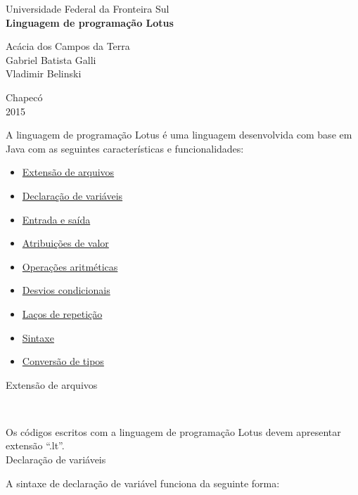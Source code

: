\documentclass[12pt,a4paper]{article}
\begin{document}
\begin{titlepage}
\begin{center}
{\large Universidade Federal da Fronteira Sul}\\[5.5cm]
{\bf \huge Linguagem de programação Lotus}\\[4.9cm]
\end{center}
{\large Acácia dos Campos da Terra}\\
{\large Gabriel Batista Galli}\\
{\large Vladimir Belinski}\\[5.8cm]
\begin{center}
{\large Chapecó}\\[0.1cm]
{\large 2015}
\end{center}
\end{titlepage}

A linguagem de programação Lotus é uma linguagem desenvolvida com base em Java com as seguintes características e funcionalidades:\\

\begin{itemize}
\item \hyperlink{label7}{Extensão de arquivos}
\item \hyperlink{label}{Declaração de variáveis}
\item \hyperlink{label1}{Entrada e saída}
\item \hyperlink{label2}{Atribuições de valor}
\item \hyperlink{label3}{Operações aritméticas}
\item \hyperlink{label4}{Desvios condicionais}
\item \hyperlink{label5}{Laços de repetição}
\item \hyperlink{label6}{Sintaxe}
\item \hyperlink{label8}{Conversão de tipos}\\[15.4cm]
\end{itemize}

\hypertarget{label7}{\Large{Extensão de arquivos}}\\[0.3cm]
\normalsize

Os códigos escritos com a linguagem de programação Lotus devem apresentar extensão ``.lt''.\\

\hypertarget{label}{\Large{Declaração de variáveis}}\\[0.3cm]
\normalsize

A sintaxe de declaração de variável funciona da seguinte forma:\\
\end{document}
